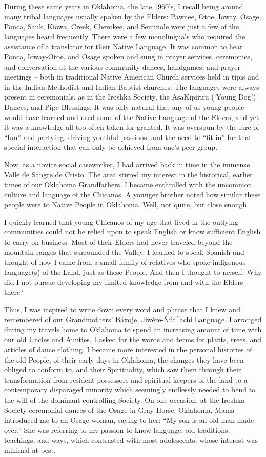 \documentclass[output=paper]{LSP/langsci}
\begin{document}
During these same years in Oklahoma, the late 1960's, I recall being around many tribal languages usually spoken by the Elders: Pawnee, Otoe, Ioway, O\-sage, Ponca, Sauk, Kiowa, Creek, Cherokee, and Seminole were just a few of the languages heard frequently. There were a few monolinguals who required the assistance of a translator for their Native Language. It was common to hear Ponca, Ioway-Otoe, and Osage spoken and sung in prayer services, ceremonies, and conversation at the various community dances, handgames, and prayer meetings -- both in traditional Native American Church services held in tipis and in the Indian Methodist and Indian Baptist churches. The languages were always present in ceremonials, as in the Iroshka Society, the AsaKipiriru (`Young Dog') Dances, and Pipe Blessings. It was only natural that any of us young people would have learned and used some of the Native Language of the Elders, and yet it was a knowledge all too often taken for granted. It was overspun by the lure of ``fun'' and partying, driving youthful passions, and the need to ``fit in'' for that special interaction that can only be achieved from one's peer group.

Now, as a novice social caseworker, I had arrived back in time in the immense Valle de Sangre de Cristo. The area stirred my interest in the historical, earlier times of our Oklahoma Grandfathers. I became enthralled with the uncommon culture and language of the Chicanos. A younger brother noted how similar these people were to Native People in Oklahoma. Well, not quite, but close enough.

I quickly learned that young Chicanos of my age that lived in the outlying communities could not be relied upon to speak English or know sufficient English to carry on business. Most of their Elders had never traveled beyond the mountain ranges that surrounded the Valley. I learned to speak Spanish and thought of how I came from a small family of relatives who spoke indigenous language(s) of the Land, just as these People. And then I thought to myself: Why did I not pursue developing my limited knowledge from and with the Elders there?

Thus, I was inspired to write down every word and phrase that I knew and remembered of our Grandmothers' B\'axoje, Jiw\'ere-\~N\'ut\^{ }achi Language. I arranged during my travels home to Oklahoma to spend an increasing amount of time with our old Uncles and Aunties. I asked for the words and terms for plants, trees, and articles of dance clothing. I became more interested in the personal histories of the old People, of their early days in Oklahoma, the changes they have been obliged to conform to, and their Spirituality, which saw them through their transformation from resident possessors and spiritual keepers of the land to a contemporary disparaged minority which seemingly endlessly needed to bend to the will of the dominant controlling Society. On one occasion, at the Iroshka Society ceremonial dances of the O\-sage in Gray Horse, Oklahoma, Mama introduced me to an Osage woman, saying to her: ``My son is an old man made over.'' She was referring to my passion to know language, old traditions, teachings, and ways, which contrasted with most adolescents, whose interest was minimal at best.
\end{document}
